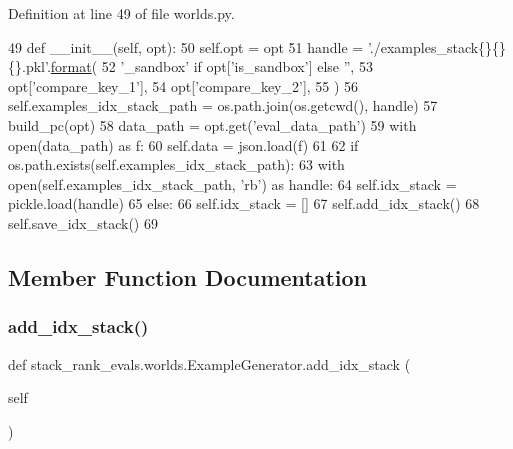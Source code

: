 Definition at line 49 of file worlds.\+py.


\begin{DoxyCode}
49     \textcolor{keyword}{def }\_\_init\_\_(self, opt):
50         self.opt = opt
51         handle = \textcolor{stringliteral}{'./examples\_stack\{\}\{\}\{\}.pkl'}.\hyperlink{namespaceparlai_1_1chat__service_1_1services_1_1messenger_1_1shared__utils_a32e2e2022b824fbaf80c747160b52a76}{format}(
52             \textcolor{stringliteral}{'\_sandbox'} \textcolor{keywordflow}{if} opt[\textcolor{stringliteral}{'is\_sandbox'}] \textcolor{keywordflow}{else} \textcolor{stringliteral}{''},
53             opt[\textcolor{stringliteral}{'compare\_key\_1'}],
54             opt[\textcolor{stringliteral}{'compare\_key\_2'}],
55         )
56         self.examples\_idx\_stack\_path = os.path.join(os.getcwd(), handle)
57         build\_pc(opt)
58         data\_path = opt.get(\textcolor{stringliteral}{'eval\_data\_path'})
59         with open(data\_path) \textcolor{keyword}{as} f:
60             self.data = json.load(f)
61 
62         \textcolor{keywordflow}{if} os.path.exists(self.examples\_idx\_stack\_path):
63             with open(self.examples\_idx\_stack\_path, \textcolor{stringliteral}{'rb'}) \textcolor{keyword}{as} handle:
64                 self.idx\_stack = pickle.load(handle)
65         \textcolor{keywordflow}{else}:
66             self.idx\_stack = []
67             self.add\_idx\_stack()
68             self.save\_idx\_stack()
69 
\end{DoxyCode}


\subsection{Member Function Documentation}
\mbox{\label{classstack__rank__evals_1_1worlds_1_1ExampleGenerator_a9bc7f39d14003d695ad66b624607dc05}} 
\subsubsection{\texorpdfstring{add\+\_\+idx\+\_\+stack()}{add\_idx\_stack()}\hspace{0.1cm}{\footnotesize\ttfamily [1/2]}}
{\footnotesize\ttfamily def stack\+\_\+rank\+\_\+evals.\+worlds.\+Example\+Generator.\+add\+\_\+idx\+\_\+stack (\begin{DoxyParamCaption}\item[{}]{self }\end{DoxyParamCaption})}



